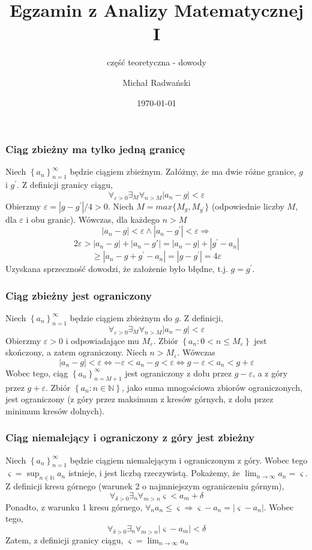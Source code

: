 \documentclass[11pt]{beamer}
\newcommand{\below}[1]{\displaystyle\mathop{#1}}
\begin{document}
	\author{Michał Radwański}
	\title{Egzamin z Analizy Matematycznej I}
	\subtitle{część teoretyczna - dowody}
	\date{\today}
	\begin{frame}[plain]
		\maketitle
	\end{frame}

\begin{frame}
\frametitle{Ciąg zbieżny ma tylko jedną granicę}
Niech $\left\{a_n\right\}_{n = 1}^{\infty}$ będzie ciągiem zbieżnym. Załóżmy, że ma dwie różne granice, $g$ i $g^\prime$. Z definicji granicy ciągu, 
\[
	\below{\forall}_{\varepsilon > 0} \below{\exists}_{M} \below{\forall}_{n > M} |a_n - g| < \varepsilon
\]
Obierzmy $\varepsilon = |g - g^\prime|/4 > 0$. Niech $M = max\{M_g, M_{g^\prime}\}$ (odpowiednie liczby $M$, dla $\varepsilon$ i obu granic). Wówczas, dla każdego $n > M$
\[
	|a_n - g| < \varepsilon  \land |a_n - g^\prime| < \varepsilon \Rightarrow
\]
\[
	2\varepsilon > |a_n - g| + |a_n - g'| = |a_n - g| + |g^\prime - a_n| 
\]
\[
	\geq |a_n - g + g^\prime - a_n| = |g - g^\prime| = 4\varepsilon
\]
Uzyskana sprzeczność dowodzi, że założenie było błędne, t.j. $g = g^\prime$.
\end{frame}
\begin{frame}
\frametitle{Ciąg zbieżny jest ograniczony}
Niech $\left\{a_n\right\}_{n = 1}^{\infty}$ będzie ciągiem zbieżnym do $g$. Z definicji,
\[
	\below{\forall}_{\varepsilon > 0} \below{\exists}_{M} \below{\forall}_{n > M} |a_n - g| < \varepsilon
\]
Obierzmy $\varepsilon > 0$ i odpowiadające mu $M_\varepsilon$. Zbiór $\left\{a_n : 0 < n \leq M_\varepsilon \right\}$ jest skończony, a zatem ograniczony.
Niech $n > M_\varepsilon$. Wówczas 
\[
	|a_n - g| < \varepsilon \Leftrightarrow -\varepsilon < a_n - g < \varepsilon \Leftrightarrow g - \varepsilon < a_n < g + \varepsilon
\]
Wobec tego, ciąg $\left\{a_n\right\}_{n = M+1}^{\infty}$ jest ograniczony z dołu przez $g - \varepsilon$, a z góry przez $g + \varepsilon$. Zbiór $\left\{a_n : n \in \mathbb{N}\right\}$, jako suma mnogościowa zbiorów ograniczonych, jest ograniczony (z góry przez maksimum z kresów górnych, z dołu przez minimum kresów dolnych).
\end{frame}
\begin{frame}
\frametitle{Ciąg niemalejący i ograniczony z góry jest zbieżny}
Niech $\left\{a_n\right\}_{n = 1}^{\infty}$ będzie ciągiem niemalejącym i ograniczonym z góry. Wobec tego $\varsigma = \sup_{n \in \mathbb N} a_n$ istnieje, i jest liczbą rzeczywistą. Pokażemy, że $\lim_{n \rightarrow \infty} a_n = \varsigma$.
Z definicji kresu górnego (warunek 2 o najmniejszym ograniczeniu górnym),
\[
	\below{\forall}_{\delta > 0} \below{\exists}_n \below{\forall}_{m > n} \varsigma < a_m + \delta
\]
Ponadto, z warunku 1 kresu górnego, $\below{\forall}_{n}a_n \leq \varsigma \Rightarrow \varsigma - a_n = |\varsigma - a_n |$.
Wobec tego,
\[
	\below{\forall}_{\delta > 0} \below{\exists}_n \below{\forall}_{m > n} |\varsigma - a_m | < \delta
\]
Zatem, z definicji granicy ciągu, $\varsigma = \displaystyle\mathop{\lim}_{n \rightarrow \infty}a_n$
\end{frame}
\end{document}
